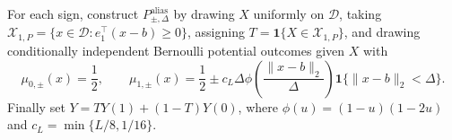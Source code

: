 For each sign, construct \(P^{\mathrm{alias}}_{\pm,\Delta}\) by drawing \(X\) uniformly on \(\mathcal D\), taking \(\mathcal X_{1,P}=\{x\in\mathcal D:e_1^{\top}(x-b)\geq0\}\), assigning \(T=\mathbf1\{X\in\mathcal X_{1,P}\}\), and drawing conditionally independent Bernoulli potential outcomes given \(X\) with
\[
 \mu_{0,\pm}(x)=\frac12,
 \qquad
 \mu_{1,\pm}(x)=\frac12\pm c_L\Delta\phi\!\left(\frac{\lVert x-b\rVert_2}{\Delta}\right)
 \mathbf1\{\lVert x-b\rVert_2<\Delta\}.
\]
Finally set \(Y=TY(1)+(1-T)Y(0)\), where \(\phi(u)=(1-u)(1-2u)\) and \(c_L=\min\{L/8,1/16\}\).